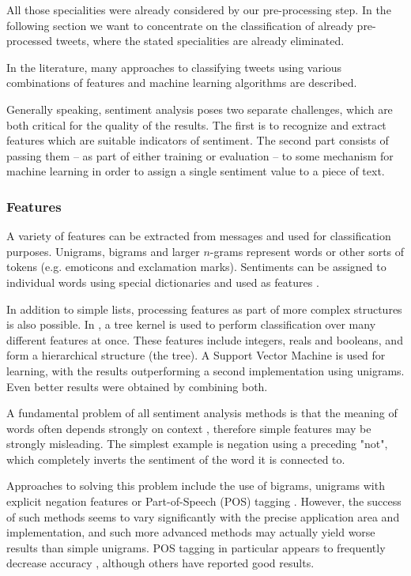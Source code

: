 \documentclass{sig-alternate}
\begin{document}
All those specialities were already considered by our pre-processing step. In the following section we want to concentrate on the classification of already pre-processed tweets, where the stated specialities are already eliminated.



\medskip

In the literature, many approaches to classifying tweets using various combinations of features and machine learning algorithms are described.

Generally speaking, sentiment analysis poses two separate challenges, which are both critical for the quality of the results. The first is to recognize and extract features which are suitable indicators of sentiment. The second part consists of passing them -- as part of either training or evaluation -- to some mechanism for machine learning in order to assign a single sentiment value to a piece of text.


\subsubsection{Features}

A variety of features can be extracted from messages and used for classification purposes. Unigrams, bigrams and larger $n$-grams represent words or other sorts of tokens (e.g. emoticons and exclamation marks). Sentiments can be assigned to individual words using special dictionaries and used as features \cite{kouloumpis2011twitter}.


In addition to simple lists, processing features as part of more complex structures is also possible. In \cite{agarwal2011sentiment}, a tree kernel is used to perform classification over many different features at once. These features include integers, reals and booleans, and form a hierarchical structure (the tree). A Support Vector Machine is used for learning, with the results outperforming a second implementation using unigrams. Even better results were obtained by combining both.


\medskip

A fundamental problem of all sentiment analysis methods is that the meaning of words often depends strongly on context \cite{vinodhini2012sentiment}, therefore simple features may be strongly misleading. The simplest example is negation using a preceding "not", which completely inverts the sentiment of the word it is connected to.

Approaches to solving this problem include the use of bigrams, unigrams with explicit negation features \cite{go2009twitter} or Part-of-Speech (POS) tagging \cite{kouloumpis2011twitter}. However, the success of such methods seems to vary significantly with the precise application area and implementation, and such more advanced methods may actually yield worse results than simple unigrams. POS tagging in particular appears to frequently decrease accuracy \cite{agarwal2011sentiment, kouloumpis2011twitter, go2009twitter}, although others have reported good results.
\end{document}

